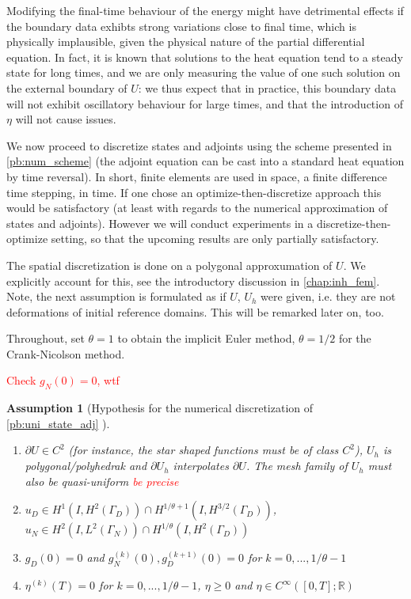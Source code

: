 \documentclass[english,a4paper,9pt,oneside]{scrbook}	%
\theoremstyle{break}
\newtheorem{ass}[equation]{Assumption}
\theoremstyle{remark}
\newcommand{\mR}{\mathbb{R}}
\newcommand{\tred}[1]{\textcolor{red}{#1}}
\begin{document}
Modifying the final-time behaviour of the energy might have detrimental effects if the boundary data exhibts strong variations close to final time, which is physically implausible, given the physical nature of the partial differential equation. In fact, it is known that solutions to the heat equation tend to a steady state for long times, and we are only measuring the value of one such solution on the external boundary of $U$: we thus expect that in practice, this boundary data will not exhibit oscillatory behaviour for large times, and that the introduction of $\eta$ will not cause issues.

We now proceed to discretize states and adjoints using the scheme presented in \cref{pb:num_scheme} (the adjoint equation can be cast into a standard heat equation by time reversal). In short, finite elements are used in space, a finite difference time stepping, in time. If one chose an optimize-then-discretize approach this would be satisfactory (at least with regards to the numerical approximation of states and adjoints). However we will conduct experiments in a discretize-then-optimize setting, so that the upcoming results are only partially satisfactory.

The spatial discretization is done on a polygonal approxumation of $U$. We explicitly account for this, see the introductory discussion in \cref{chap:inh_fem}. Note, the next assumption is formulated as if $U$, $U_h$ were given, i.e. they are not deformations of initial reference domains. This will be remarked later on, too. 

Throughout, set $\theta=1$ to obtain the implicit Euler method, $\theta=1/2$ for the Crank-Nicolson method.

\tred{Check $g_N(0)=0$, wtf}

\begin{ass}[Hypothesis for the numerical discretization of \cref{pb:uni_state_adj} ]
\label{ass:num_discr_shopt}
\textcolor{white}{ }
\begin{enumerate}
	\item $\partial U \in C^2$ (for instance, the star shaped functions must be of class $C^2$), $U_h$ is polygonal/polyhedrak and $\partial U_h$ interpolates $\partial U$. The mesh family of $U_h$ must also be quasi-uniform \textcolor{red}{be precise}
	\item $u_D \in H^1(I, H^{2}(\Gamma_D)) \cap H^{1/\theta+1}(I,H^{3/2}(\Gamma_D))$, $u_N \in H^2(I,L^2(\Gamma_N)) \cap H^{1/\theta}(I, H^2(\Gamma_D))$
	\item $g_D(0)=0$ and $g_N^{(k)}(0), g_D^{(k+1)}(0)  = 0$ for $k=0,..., 1/\theta-1$
	\item $\eta^{(k)}(T)  = 0$ for $k=0,..., 1/\theta-1$, $\eta \geq 0$ and $\eta \in C^{\infty}([0,T];\mR)$
\end{enumerate}

\end{ass}
\end{document}
